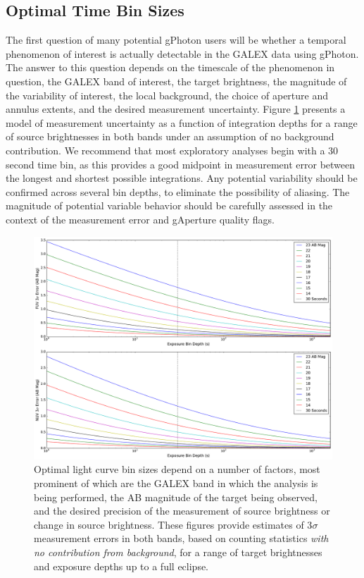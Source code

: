\documentclass[preprint]{aastex}
\begin{document}
\subsection{Optimal Time Bin Sizes}
\label{optbinsize}
The first question of many potential gPhoton users will be whether a temporal phenomenon of interest is actually detectable in the GALEX data using gPhoton. The answer to this question depends on the timescale of the phenomenon in question, the GALEX band of interest, the target brightness, the magnitude of the variability of interest, the local background, the choice of aperture and annulus extents, and the desired measurement uncertainty. Figure \ref{sigmadetlim} presents a model of measurement uncertainty as a function of integration depths for a range of source brightnesses in both bands under an assumption of no background contribution. We recommend that most exploratory analyses begin with a 30 second time bin, as this provides a good midpoint in measurement error between the longest and shortest possible integrations. Any potential variability should be confirmed across several bin depths, to eliminate the possibility of aliasing. The magnitude of potential variable behavior should be carefully assessed in the context of the measurement error and gAperture quality flags.

\clearpage
\begin{figure}[h]
\includegraphics[scale=0.49]{Fig11.pdf}
\caption{Optimal light curve bin sizes depend on a number of factors, most prominent of which are the GALEX band in which the analysis is being performed, the AB magnitude of the target being observed, and the desired precision of the measurement of source brightness or change in source brightness. These figures provide estimates of 3$\sigma$ measurement errors in both bands, based on counting statistics \emph{with no contribution from background}, for a range of target brightnesses and exposure depths up to a full eclipse.
\label{sigmadetlim}}
\end{figure}
\clearpage
\end{document}

